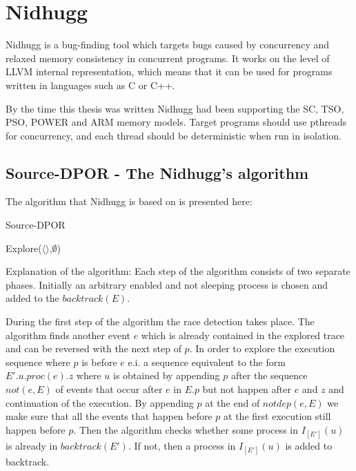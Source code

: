 \chapter{Nidhugg}
\label{Chapter 3}

Nidhugg is a bug-finding tool which targets bugs caused by concurrency
and relaxed memory consistency in concurrent programs. It works on the
level of LLVM internal representation, which means that it can be used
for programs written in languages such as C or C++.

By the time this thesis was written Nidhugg had been supporting the SC, TSO, PSO, POWER and ARM memory
models. Target programs should use pthreads for concurrency, and each
thread should be deterministic when run in isolation.

\section{Source-DPOR - The Nidhugg's algorithm}

The algorithm that Nidhugg is based on is presented here:\\

\begin{algorithm}
    \caption{Source-DPOR}
    Explore($\langle \rangle$,$\emptyset$)\;
\end{algorithm}

\noindent Explanation of the algorithm: Each step of the algorithm consists of two separate phases. Initially an arbitrary enabled and not sleeping
process is chosen and added to the $backtrack(E)$. 

During the first step of the algorithm the race detection takes place.
The algorithm finds another event $e$ which is already contained in the explored trace and can be reversed with the next step of $p$.
In order to explore the execution sequence where $p$ is before $e$ e.i. a sequence equivalent to the form $E'.u.proc(e).z$ where $u$ is obtained by appending $p$ after the sequence
$not(e,E)$ of events that occur after $e$ in $E.p$ but not happen after $e$ and $z$ and continuation of the execution. By appending $p$ at the end of $notdep(e,E)$ we make sure that all the events that happen
before $p$ at the first execution still happen before $p$. Then the algorithm checks whether some process in $I_{[E']}(u)$ is already in $backtrack(E')$. If not, then a process in $I_{[E']}(u)$ is added to backtrack. 

